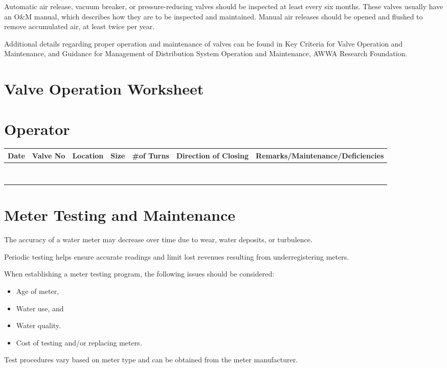 \documentclass[10pt]{article}
\begin{document}
Automatic air release, vacuum breaker, or pressure-reducing valves should be inspected at least every six months. These valves usually have an O\&M manual, which describes how they are to be inspected and maintained. Manual air releases should be opened and flushed to remove accumulated air, at least twice per year.

Additional details regarding proper operation and maintenance of valves can be found in Key Criteria for Valve Operation and Maintenance, and Guidance for Management of Distribution System Operation and Maintenance, AWWA Research Foundation.

\section{Valve Operation Worksheet}
\section{Operator}
\begin{tabular}{|l|l|l|l|l|l|l|}
\hline
Date & Valve No & Location & Size & \#of Turns & Direction of Closing & Remarks/Maintenance/Deficiencies \\
\hline
 &  &  &  &  &  &  \\
\hline
 &  &  &  &  &  &  \\
\hline
 &  &  &  &  &  &  \\
\hline
 &  &  &  &  &  &  \\
\hline
 &  &  &  &  &  &  \\
\hline
 &  &  &  &  &  &  \\
\hline
 &  &  &  &  &  &  \\
\hline
 &  &  &  &  &  &  \\
\hline
\end{tabular}

\section{Meter Testing and Maintenance}
The accuracy of a water meter may decrease over time due to wear, water deposits, or turbulence.

Periodic testing helps ensure accurate readings and limit lost revenues resulting from underregistering meters.

When establishing a meter testing program, the following issues should be considered:

\begin{itemize}
  \item Age of meter,

  \item Water use, and

  \item Water quality.

  \item Cost of testing and/or replacing meters.

\end{itemize}
Test procedures vary based on meter type and can be obtained from the meter manufacturer.
\end{document}
